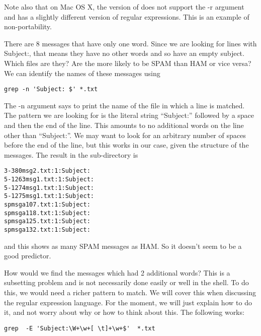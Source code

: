 Note also that on Mac OS X,  the version of  does not 
support the -r argument and has a slightly different version of
regular expressions.  This is an example of non-portability.

There are 8 messages that have only one word. Since we
are looking for lines with Subject:, that means they have
no other words and so have an empty subject.
Which files are they?  Are the more likely to be SPAM than HAM or
vice versa?
We can identify the names of these messages using
\begin{verbatim}
grep -n 'Subject: $' *.txt
\end{verbatim}
The -n argument says to print the name of the file in which a line is
matched.
The pattern we are looking for is the literal string ``Subject:''
followed by a space and then the end of the line.
This amounts to no additional words on the line other than ``Subject:''.
We may want to look for an arbitrary number of spaces before the end
of the line, but this works in our case, given the structure of the messages.
The result in the  sub-directory is
\begin{verbatim}
3-380msg2.txt:1:Subject: 
5-1263msg1.txt:1:Subject: 
5-1274msg1.txt:1:Subject: 
5-1275msg1.txt:1:Subject: 
spmsga107.txt:1:Subject: 
spmsga118.txt:1:Subject: 
spmsga125.txt:1:Subject: 
spmsga132.txt:1:Subject: 
\end{verbatim}
and this shows as many SPAM messages as HAM. So it doesn't seem to be
a good predictor.




\begin{comment}
Another approach to the whole problem is to iterate over all the
messages
and append the name of the message file to a ``list'' containing other
messages with that number of words in the subject line.
\begin{verbatim}
for i in `ls *.txt` ; do 
  grep 'Subject:' $i | wc -w | grep -v total | sed -re 's/^ +([0-9]+).*$/\1/g' ; done | sort | uniq -c
\end{verbatim}
\end{comment}


How would we find the messages which had 2 additional words?
This is a subsetting problem and is not necessarily done easily or
well in the shell. 
To do this, we would need a richer pattern to match.
We will cover this when discussing the regular expression
language.
For the moment, we will just explain how to do it, 
and not worry about why or how to think about this.
The following works:
\begin{verbatim}
grep  -E 'Subject:\W+\w+[ \t]+\w+$'  *.txt 
\end{verbatim}




\begin{comment}
 
sort, uniq
sed
cut, paste, join
perl
\end{comment}
